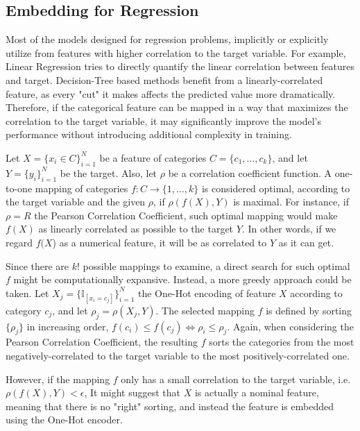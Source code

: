 \documentclass{article}
\begin{document}
\subsection{Embedding for Regression}
Most of the models designed for regression problems, implicitly or explicitly utilize from features with higher correlation to the target variable. For example, Linear Regression tries to directly quantify the linear correlation between features and target. Decision-Tree based methods benefit from a linearly-correlated feature, as every "cut" it makes affects the predicted value more dramatically. Therefore, if the categorical feature can be mapped in a way that maximizes the correlation to the target variable, it may significantly improve the model's performance without introducing additional complexity in training.

Let $X=\{x_i \in C\}_{i=1}^N$ be a feature of categories $C=\{c_1,\dots,c_k\}$, and let $Y=\{y_i\}_{i=1}^N$ be the target. Also, let $\rho$ be a correlation coefficient function. 
A one-to-one mapping of categories $f: C\to\{1,\dots,k\}$ is considered optimal, according to  the target variable and the given $\rho$, if $\rho(f(X), Y)$ is maximal.
For instance, if $\rho = R$ the Pearson Correlation Coefficient, such optimal mapping would make $f(X)$ as linearly correlated as possible to the target $Y$. In other words, if we regard $f(X$) as a numerical feature, it will be as correlated to $Y$ as it can get.

Since there are $k!$ possible mappings to examine, a direct search for such optimal $f$ might be computationally expansive. Instead, a more greedy approach could be taken. Let $X_j = \{\mathbb{I}_{[x_i = c_j]}\}_{i=1}^N$ the One-Hot encoding of feature $X$ according to category $c_j$, and let $\rho_j = \rho(X_j,Y)$. 
The selected mapping $f$ is defined by sorting $\{\rho_j\}$ in increasing order, 
$f(c_i) \leq f(c_j) \iff \rho_i \leq \rho_j$. Again, when considering the Pearson Correlation Coefficient, the resulting $f$ sorts the categories from the most negatively-correlated to the target variable to the most positively-correlated one.

However, if the mapping $f$ only has a small correlation to the target variable, i.e. $\rho(f(X), Y) < \epsilon$, 
It might suggest that $X$ is actually a nominal feature, meaning that there is no "right"  sorting, and instead the feature is embedded using the One-Hot encoder.
\end{document}

